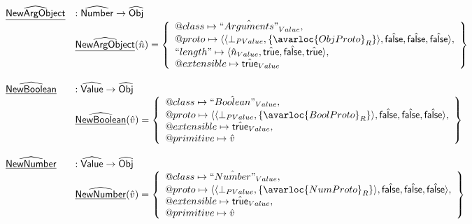 \[
\begin{array}{ll}
\ahf{NewArgObject} & : \abs{Number} \rightarrow \aObj \\
& \ahf{NewArgObject}(\hat{n}) = \set{
    \varprop{class}\mapsto \hat{``Arguments"}_{Value},\\
    \varprop{proto}\mapsto 
    \langle\langle\bot_{PValue},\{\avarloc{ObjProto}_R\}\rangle,\afalse,\afalse,\afalse\rangle,\\
   ``length"\mapsto
   \langle\hat{n}_{Value},\atrue,\afalse,\atrue\rangle,\\
  \varprop{extensible}\mapsto \atrue_{Value}
}\\\\

\ahf{NewBoolean} & : \abs{Value} \rightarrow \aObj \\
& \ahf{NewBoolean}(\hat{v}) = \set{
    \varprop{class}\mapsto \hat{``Boolean"}_{Value},\\
    \varprop{proto}\mapsto 
    \langle\langle\bot_{PValue},\{\avarloc{BoolProto}_R\}\rangle,\afalse,\afalse,\afalse\rangle,\\
    \varprop{extensible}\mapsto \atrue_{Value}, \\
    \varprop{primitive}\mapsto \hat{v}
}\\\\

\ahf{NewNumber} & : \abs{Value} \rightarrow \aObj \\
& \ahf{NewNumber}(\hat{v}) = \set{
    \varprop{class}\mapsto \hat{``Number"}_{Value},\\
    \varprop{proto}\mapsto 
    \langle\langle\bot_{PValue},\{\avarloc{NumProto}_R\}\rangle,\afalse,\afalse,\afalse\rangle,\\
    \varprop{extensible}\mapsto \atrue_{Value}, \\
    \varprop{primitive}\mapsto \hat{v}
}\\\\


\end{array}\]
